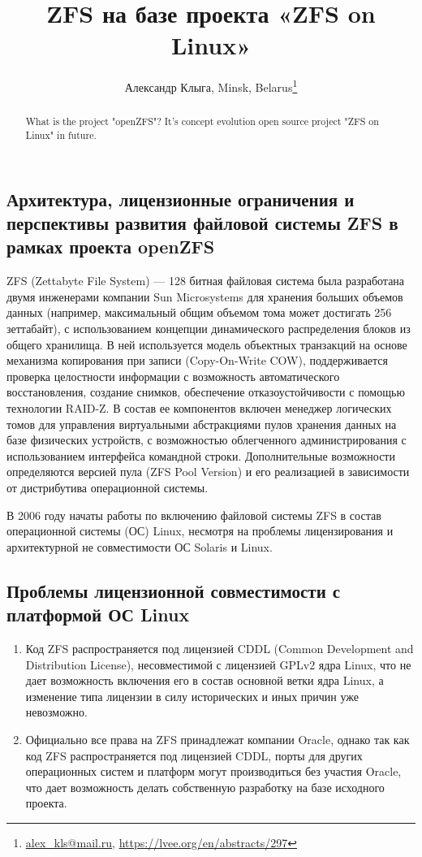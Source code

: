 \documentclass[10pt, a5paper]{article}
\begin{document}
\title{ZFS на базе проекта «ZFS on Linux»}
\author{Александр Клыга, Minsk, Belarus\footnote{\url{alex_kls@mail.ru}, \url{https://lvee.org/en/abstracts/297}}}
\maketitle
\begin{abstract}
What is the project "openZFS"? It's concept evolution open source project "ZFS on Linux" in future.
\end{abstract}
\subsection*{Архитектура, лицензионные ограничения и перспективы развития файловой системы ZFS в рамках проекта openZFS}

ZFS (Zettabyte File System) \cite{bib1} — 128 битная файловая система была разработана двумя инженерами компании Sun Microsystems для хранения больших объемов данных (например, максимальный общим  объемом тома может достигать 256 зеттабайт), с использованием концепции динамического распределения блоков из общего хранилища. В ней используется модель объектных транзакций на основе механизма копирования при записи (Copy-On-Write COW), поддерживается проверка целостности информации с возможность автоматического восстановления, создание снимков, обеспечение отказоустойчивости с помощью технологии RAID-Z. В состав  ее компонентов  включен менеджер логических томов для управления виртуальными абстракциями пулов хранения данных на базе физических устройств, с возможностью облегченного администрирования с использованием интерфейса командной строки. Дополнительные возможности  определяются версией пула (ZFS Pool Version) и его реализацией в зависимости от дистрибутива операционной системы.

В 2006 году начаты работы по включению файловой системы ZFS в состав операционной системы (ОС) Linux, несмотря на проблемы лицензирования и архитектурной не совместимости ОС \linebreak Solaris и Linux.

\subsection*{Проблемы лицензионной совместимости  с платформой ОС Linux}

\begin{enumerate}
  \item Код ZFS распространяется под лицензией CDDL (Common Development and Distribution License), несовместимой с лицензией GPLv2 ядра Linux, что не дает возможность включения его в состав основной ветки ядра Linux, а изменение типа лицензии в силу исторических и иных причин уже невозможно.
  \item Официально все права на ZFS принадлежат компании Oracle, однако так как код ZFS распространяется под лицензией \linebreak CDDL, порты для других операционных систем и платформ могут производиться без участия Oracle, что дает возможность делать собственную разработку на базе исходного проекта.
\end{enumerate}
\end{document}
